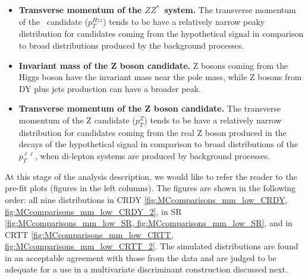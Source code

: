 \begin{itemize}
\item{\bfseries Transverse momentum of the $ZZ^*$~system.} 
The transverse momentum of the \HZZ~candidate ($p_T^{Hzz}$) tends to be have a relatively narrow peaky distribution for candidates coming from the hypothetical signal in comparison to broad distributions produced by the background processes. 

\item{\bfseries Invariant mass of the Z boson candidate.} 
Z bosons coming from the Higgs boson have the invariant mass near the pole mass, while Z bosons from DY plus jets production can have a broader peak.

\item{\bfseries Transverse momentum of the Z boson candidate.} 
The transverse momentum of the Z candidate ($p_T^Z$) tends to be have a relatively narrow distribution for candidates coming from the real Z boson produced in the decays of the hypothetical signal in comparison to broad distributions of the $p_T^{\ell\ell}$, when di-lepton systems are produced by background processes. 

\end{itemize}
           
At this stage of the analysis description, we would like to refer the reader to the pre-fit plots (figures in the left columns). The figures are shown in the following order: all nine distributions in CRDY \ref{fig:MCcomparisons_mm_low_CRDY, fig:MCcomparisons_mm_low_CRDY_2}, in SR \ref{fig:MCcomparisons_mm_low_SR, fig:MCcomparisons_mm_low_SR}, and in CRTT \ref{fig:MCcomparisons_mm_low_CRTT, fig:MCcomparisons_mm_low_CRTT_2}. The simulated distributions are found in an acceptable agreement with those from the data and are judged to be adequate for a use in a multivariate discriminant construction discussed next. 

